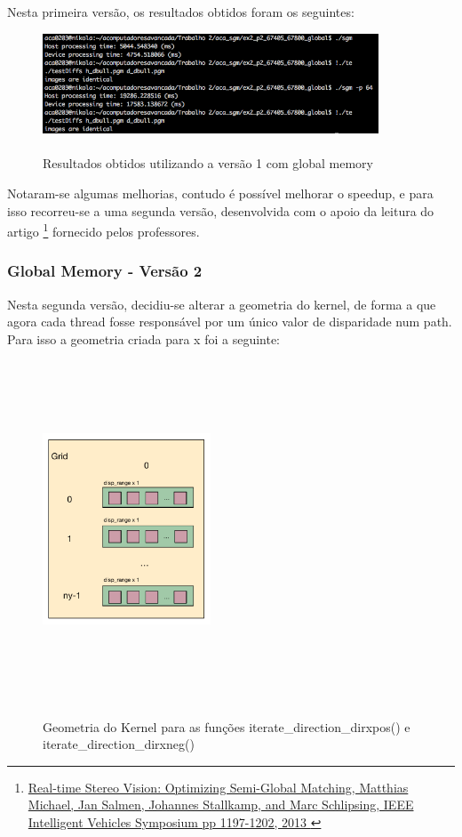 \documentclass[pdftex,12pt,a4paper]{report}
\begin{document}
Nesta primeira versão, os resultados obtidos foram os seguintes:

\begin{figure}[!htb]
\center
 \includegraphics[width=100mm,scale=1]{IteratePositionsV1.png}
 \caption{\\ Resultados obtidos utilizando a versão 1 com global memory}
 \label{fig:IteratePositionsV1}
\end{figure}

Notaram-se algumas melhorias, contudo é possível melhorar o speedup, e para isso recorreu-se a uma segunda versão, desenvolvida com o apoio da leitura do artigo  \footnote{\label{url1} \href{http://elearning.ua.pt/mod/resource/view.php?id=217488}{Real-time Stereo Vision: Optimizing Semi-Global Matching, Matthias Michael, Jan Salmen, Johannes Stallkamp, and Marc Schlipsing, IEEE Intelligent Vehicles Symposium pp 1197-1202, 2013 }} fornecido pelos professores.

\newpage
\subsubsection{Global Memory - Versão 2}

Nesta segunda versão, decidiu-se alterar a geometria do kernel, de forma a que agora cada thread fosse responsável por um único valor de disparidade num path. Para isso a geometria criada para x foi a seguinte:

\begin{figure}[!htb]
\center
 \includegraphics[width=50mm,height=100mm,scale=1]{IteratePositionDirxposneg_v2_kernel.pdf}
 \caption{\\ Geometria do Kernel para as funções iterate\_direction\_dirxpos() e iterate\_direction\_dirxneg()}
 \label{fig:IteratePositionDirxposneg_v2_kernel}
\end{figure}
\end{document}
